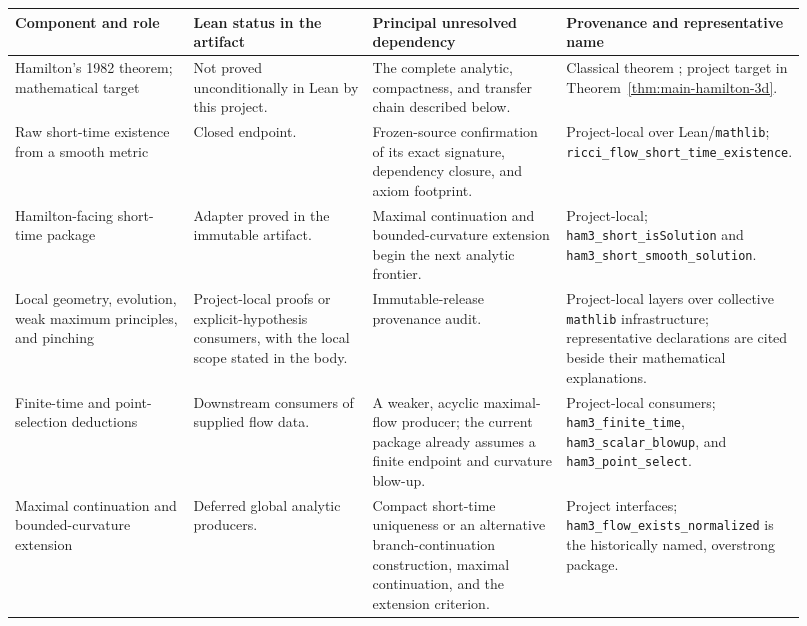 \documentclass[11pt]{article}
\theoremstyle{plain}
\theoremstyle{definition}
\theoremstyle{remark}
\newcommand{\leanref}[1]{\nolinkurl{#1}}
\begin{document}
\begin{table}[htbp]
\centering
\scriptsize
\renewcommand{\arraystretch}{1.12}
\begin{tabular}{@{}>{\raggedright\arraybackslash}p{0.23\linewidth}
                    >{\raggedright\arraybackslash}p{0.23\linewidth}
                    >{\raggedright\arraybackslash}p{0.25\linewidth}
                    >{\raggedright\arraybackslash}p{0.21\linewidth}@{}}
\toprule
\textbf{Component and role} & \textbf{Lean status in the artifact} &
\textbf{Principal unresolved dependency} & \textbf{Provenance and representative name} \\
\midrule
Hamilton's 1982 theorem; mathematical target & Not proved unconditionally in Lean by this project. & The complete analytic, compactness, and transfer chain described below. & Classical theorem \cite{MR664497}; project target in Theorem~\ref{thm:main-hamilton-3d}. \\
Raw short-time existence from a smooth metric & Closed endpoint. & Frozen-source confirmation of its exact signature, dependency closure, and axiom footprint. & Project-local over Lean/\texttt{mathlib}; \leanref{ricci_flow_short_time_existence}. \\
Hamilton-facing short-time package & Adapter proved in the immutable artifact. & Maximal continuation and bounded-curvature extension begin the next analytic frontier. & Project-local; \leanref{ham3_short_isSolution} and \leanref{ham3_short_smooth_solution}. \\
Local geometry, evolution, weak maximum principles, and pinching & Project-local proofs or explicit-hypothesis consumers, with the local scope stated in the body. & Immutable-release provenance audit. & Project-local layers over collective \texttt{mathlib} infrastructure; representative declarations are cited beside their mathematical explanations. \\
Finite-time and point-selection deductions & Downstream consumers of supplied flow data. & A weaker, acyclic maximal-flow producer; the current package already assumes a finite endpoint and curvature blow-up. & Project-local consumers; \leanref{ham3_finite_time}, \leanref{ham3_scalar_blowup}, and \leanref{ham3_point_select}. \\
Maximal continuation and bounded-curvature extension & Deferred global analytic producers. & Compact short-time uniqueness or an alternative branch-continuation construction, maximal continuation, and the extension criterion. & Project interfaces; \leanref{ham3_flow_exists_normalized} is the historically named, overstrong package. \\

\end{tabular}
\end{table}
\end{document}
